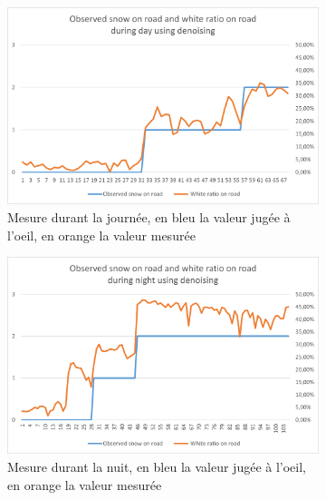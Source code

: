 \begin{figure}[H]
    \begin{subfigure}{.45\textwidth}
        \includegraphics[width=\linewidth]{Images/computer_vision/snowOnRoad/dayMes_noNoise.png}
        \caption{Mesure durant la journée, en bleu la valeur jugée à l'oeil, en orange la valeur mesurée}
        \label{fig:SnowOnRoad_noNoise_dayMes}
    \end{subfigure}
    \hfill
    \begin{subfigure}{.45\textwidth}
        \includegraphics[width=\linewidth]{Images/computer_vision/snowOnRoad/nightMes_noNoise.png}
        \caption{Mesure durant la nuit, en bleu la valeur jugée à l'oeil, en orange la valeur mesurée}
        \label{fig:SnowOnRoad_noNoise_nightMes}
    \end{subfigure}
    \hfill
    \begin{subfigure}{.45\textwidth}

\end{subfigure}
\end{figure}
